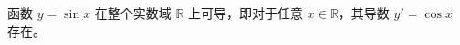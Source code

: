 \documentclass[UTF8]{ctexart}
\begin{document}
函数 \( y = \sin x \) 在整个实数域 \( \mathbb{R} \) 上可导，即对于任意 \( x \in \mathbb{R} \)，其导数 \( y' = \cos x \) 存在。
\end{document}
